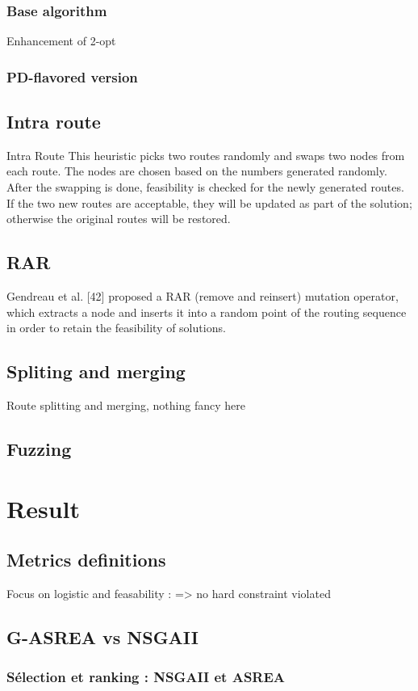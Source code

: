 \documentclass[12pt]{memoir}
\begin{document}
\subsubsection{Base algorithm}
Enhancement of 2-opt
\subsubsection{PD-flavored version}

\subsection{Intra route}
Intra Route This heuristic picks two routes randomly and swaps two nodes from each route.
The nodes are chosen based on the numbers generated randomly. After the
swapping is done, feasibility is checked for the newly generated routes. If the
two new routes are acceptable, they will be updated as part of the solution;
otherwise the original routes will be restored.
\subsection{RAR}
Gendreau et al. [42] proposed a RAR (remove and
reinsert) mutation operator, which extracts a node and inserts it into a random point of
the routing sequence in order to retain the feasibility of solutions.
\subsection{Spliting and merging}
Route splitting and merging, nothing fancy here 
\subsection{Fuzzing}

\section{Result}
\subsection{Metrics definitions}
Focus on logistic and feasability : => no hard constraint violated
\subsection{G-ASREA vs NSGAII}
\subsubsection{Sélection et ranking : NSGAII et
	ASREA}\label{suxe9lection-et-ranking-nsgaii-et-asrea}
\end{document}
